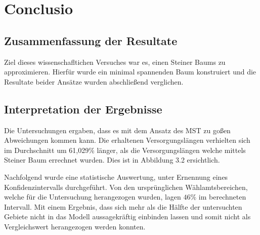 \chapter{Conclusio}



\section{ Zusammenfassung der Resultate}
\label{sec:4 conclusio}

Ziel dieses wissenschafltichen Versuches war es, einen  Steiner Baums\cite{jungnickel1} zu approximieren.
Hierfür wurde ein minimal spannenden Baum \cite{krumke1} konstruiert und die Resultate beider Ansätze wurden abschließend verglichen.

\section{ Interpretation der Ergebnisse}
\label{sec:4 conclusio}

\par  Die Untersuchungen ergaben, dass es mit dem Ansatz des MST zu goßen Abweichungen kommen kann.
Die erhaltenen Versorgungslängen verhielten sich im Durchschnitt um 61,029\% länger, als 
die Versorgungslängen welche mittels Steiner Baum errechnet wurden. Dies ist in Abbildung 3.2 ersichtlich.

\vspace{0.5cm}

Nachfolgend wurde eine statistische Auswertung, unter Ernennung eines Konfidenzintervalls durchgeführt.
Von den ursprünglichen Wählamtsbereichen, welche für die Untersuchung herangezogen wurden, lagen $46\%$ im berechneten Intervall.
Mit einem Ergebnis, dass sich mehr als die Hälfte der untersuchten Gebiete nicht in das Modell aussagekräftig einbinden lassen und somit nicht
als Vergleichswert herangezogen werden konnten.\\







